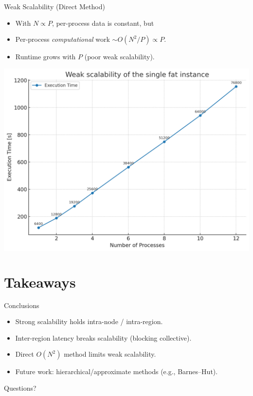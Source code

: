 \documentclass{beamer}
\begin{document}
\begin{frame}{Weak Scalability (Direct Method)}
  \begin{itemize}
    \item With $N \propto P$, per-process data is constant, but
    \item Per-process \emph{computational} work $\sim O(N^2/P)\propto P$.
    \item Runtime grows with $P$ (poor weak scalability).
  \end{itemize}
  \centering
  \includegraphics[width=0.8\linewidth]{parallel_weak_scalability.png}
\end{frame}

\section{Takeaways}
\begin{frame}{Conclusions}
  \begin{itemize}
    \item Strong scalability holds intra-node / intra-region.
    \item Inter-region latency breaks scalability (blocking collective).
    \item Direct $O(N^2)$ method limits weak scalability.
    \item Future work: hierarchical/approximate methods (e.g., Barnes--Hut).
  \end{itemize}
\end{frame}

\begin{frame}[standout]
  Questions?
\end{frame}

%   
%   
\end{document}

